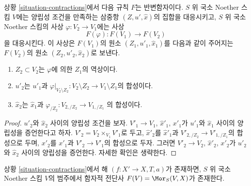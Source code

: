 \begin{lemma}
\label{lemma-functor}
상황 \ref{situation-contractions}에서 다음 규칙 $F$는 반변함자이다.
$S$ 위 국소 Noether 스킴 $V$에는 양립성 조건을 만족하는 삼중항
$(Z, u', \hat x)$의 집합을 대응시키고, $S$ 위 국소 Noether 스킴의 사상
$\varphi : V_2 \to V_1$에는 사상
$$
F(\varphi) : F(V_1) \longrightarrow F(V_2)
$$
을 대응시킨다. 이 사상은 $F(V_1)$의 원소
$(Z_1, u'_1, \hat x_1)$를 다음과 같이 주어지는 $F(V_2)$의 원소
$(Z_2, u'_2, \hat x_2)$로 보낸다.
\begin{enumerate}
\item $Z_2 \subset V_2$는 $\varphi$에 의한 $Z_1$의 역상이다.
\item $u'_2$는 $u'_1$과
$\varphi|_{V_2 \setminus Z_2} : V_2 \setminus Z_2 \to V_1 \setminus Z_1$의 합성이다.
\item $\hat x_2$는 $\hat x_1$과
$\varphi_{/Z_2} : V_{2, /Z_2} \to V_{1, /Z_1}$
의 합성이다.
\end{enumerate}
\end{lemma}

\begin{proof}
$u'_2$와 $\hat x_2$ 사이의 양립성 조건을 보자.
$V'_1 \to V_1$, $\hat x'_1$, $x'_1$가 $u'_1$와 $\hat x_1$ 사이의
양립성을 증언한다고 하자. $V'_2 = V_2 \times_{V_1} V'_1$로 두고,
$\hat x'_2$를 $\hat x'_1$과 $V'_{2, /Z_2} \to V'_{1, /Z_1}$의 합성으로
두며, $x'_2$를 $x'_1$과 $V'_2 \to V'_1$의 합성으로 두자.
그러면 $V'_2 \to V_2$, $\hat x'_2$, $x'_2$가 $u'_2$와 $\hat x_2$
사이의 양립성을 증언한다. 자세한 확인은 생략한다.
\end{proof}

\begin{lemma}
\label{lemma-solution}
상황 \ref{situation-contractions}에서 해 $(f : X' \to X, T, a)$가
존재하면, $S$ 위 국소 Noether 스킴 $V$의 범주에서 함자적 전단사
$F(V) = \Mor_S(V, X)$가 존재한다.
\end{lemma}

